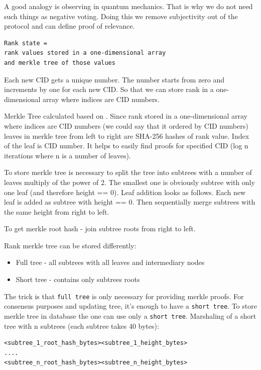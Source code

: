 \documentclass[8pt,oneside]{amsart}
\newcommand{\linkgreen}[2]{\href{#1}{\color{green}{#2}}}
\newcommand{\code}[1]{{\PlayBold #1}}
\begin{document}
A good analogy is observing in quantum mechanics. That is why we do not need such things as negative voting. Doing this we remove subjectivity out of the protocol and can define proof of relevance.

\begin{lstlisting}
Rank state =
rank values stored in a one-dimensional array
and merkle tree of those values
\end{lstlisting}

Each new CID gets a unique number. The number starts from zero and increments by one for each new CID. So that we can store rank in a one-dimensional array where indices are CID numbers.

Merkle Tree calculated based on \linkgreen{https://tools.ietf.org/html/rfc6962#section-2.1}{RFC-6962 standard}. Since rank stored in a one-dimensional array where indices are CID numbers (we could say that it ordered by CID numbers) leaves in merkle tree from left to right are \code{SHA-256} hashes of rank value. Index of the leaf is CID number. It helps to easily find proofs for specified CID (\code{log n} iterations where \code{n} is a number of leaves).

To store merkle tree is necessary to split the tree into subtrees with a number of leaves multiply of the power of 2. The smallest one is obviously subtree with only one leaf (and therefore \code{height == 0}). Leaf addition looks as follows. Each new leaf is added as subtree with \code{height == 0}. Then sequentially merge subtrees with the same \code{height} from right to left.

To get merkle root hash - join subtree roots from right to left.

Rank merkle tree can be stored differently:

\begin{itemize}
\item[] Full tree - all subtrees with all leaves and intermediary nodes
\item[] Short tree - contains only subtrees roots
\end{itemize}

The trick is that \verb|full tree| is only necessary for providing merkle proofs. For consensus purposes and updating tree, it's enough to have a \verb|short tree|. To store merkle tree in database the one can use only a \verb|short tree|. Marshaling of a short tree with \code{n} subtrees (each subtree takes 40 bytes):

\begin{lstlisting}
<subtree_1_root_hash_bytes><subtree_1_height_bytes>
....
<subtree_n_root_hash_bytes><subtree_n_height_bytes>
\end{lstlisting}
\end{document}
